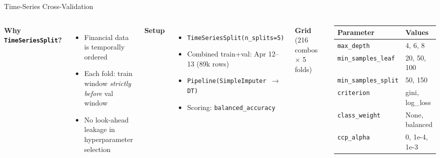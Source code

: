 \documentclass[aspectratio=169,10pt]{beamer}
\newcommand{\code}[1]{\texttt{\small #1}}
\begin{document}
\begin{frame}{Time-Series Cross-Validation}
  \begin{columns}[T]
    \textbf{Why \code{TimeSeriesSplit}?}
    \begin{itemize}
      \item Financial data is temporally ordered
      \item Each fold: train window \emph{strictly before} val window
      \item No look-ahead leakage in hyperparameter selection
    \end{itemize}

    \medskip

    \textbf{Setup}
    \begin{itemize}
      \item \code{TimeSeriesSplit(n\_splits=5)}
      \item Combined train+val: Apr 12–13 (89k rows)
      \item \code{Pipeline(SimpleImputer $\to$ DT)}
      \item Scoring: \code{balanced\_accuracy}
    \end{itemize}

    \medskip
    \textbf{Grid} (216 combos $\times$ 5 folds)
    \begin{center}
    \small
    \begin{tabular}{ll}
      \toprule
      Parameter & Values \\
      \midrule
      \code{max\_depth}          & 4, 6, 8 \\
      \code{min\_samples\_leaf}  & 20, 50, 100 \\
      \code{min\_samples\_split} & 50, 150 \\
      \code{criterion}           & gini, log\_loss \\
      \code{class\_weight}       & None, balanced \\
      \code{ccp\_alpha}          & 0, 1e-4, 1e-3 \\
      \bottomrule
    \end{tabular}
    \end{center}
  \end{columns}
\end{frame}
\end{document}
